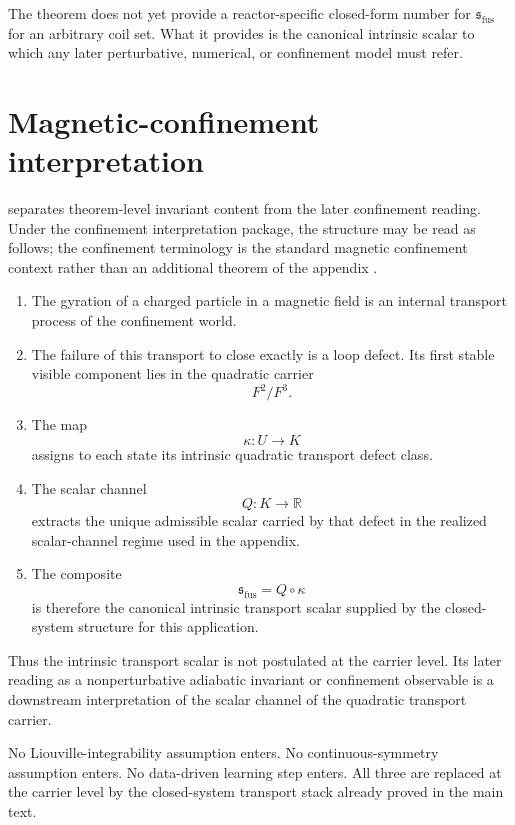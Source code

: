 \begin{remark}
	The theorem does not yet provide a reactor-specific closed-form number
	for \(\mathfrak s_{\mathrm{fus}}\) for an arbitrary coil set.
	What it provides is the canonical intrinsic scalar to which any later
	perturbative, numerical, or confinement model must refer.
\end{remark}
\section{Magnetic-confinement interpretation}
\label{sec:fusion-interpretation}
 separates theorem-level invariant content
from the later confinement reading.
Under the confinement interpretation package, the structure may be read
as follows; the confinement terminology is the standard magnetic
confinement context rather than an additional theorem of the appendix
\cite{Wilson1974}.
\begin{enumerate}[label=\textup{(\roman*)}]
	\item
	      The gyration of a charged particle in a magnetic field is an internal
	      transport process of the confinement world.
	\item
	      The failure of this transport to close exactly is a loop defect.
	      Its first stable visible component lies in the quadratic carrier
	      \[
		      F^2/F^3.
	      \]
	\item
	      The map
	      \[
		      \kappa:U\to K
	      \]
	      assigns to each state its intrinsic quadratic transport defect class.
	\item
	      The scalar channel
	      \[
		      Q:K\to\mathbb R
	      \]
	      extracts the unique admissible scalar carried by that defect in the
	      realized scalar-channel regime used in the appendix.
	\item
	      The composite
	      \[
		      \mathfrak s_{\mathrm{fus}}=Q\circ\kappa
	      \]
	      is therefore the canonical intrinsic transport scalar supplied by
	      the closed-system structure for this application.
\end{enumerate}
Thus the intrinsic transport scalar is not postulated at the
carrier level.
Its later reading as a nonperturbative adiabatic invariant or
confinement observable is a downstream interpretation of the scalar
channel of the quadratic transport carrier.
\begin{remark}
	No Liouville-integrability assumption enters.
	No continuous-symmetry assumption enters.
	No data-driven learning step enters.
	All three are replaced at the carrier level by the closed-system
	transport stack already proved in the main text.
\end{remark}
